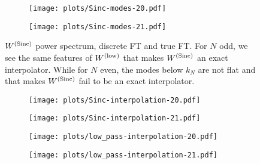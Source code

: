\begin{figure}
   \begin{subfigure}[b]{0.5\textwidth}
         \centering
         \texttt{[image: plots/Sinc-modes-20.pdf]}
     \end{subfigure}
   \begin{subfigure}[b]{0.5\textwidth}
         \centering
         \texttt{[image: plots/Sinc-modes-21.pdf]}
     \end{subfigure}
        \caption{$W^\mathrm{(Sinc)}$ power spectrum, discrete FT and true FT.
        For $N$ odd, we see the same features of $W^\mathrm{(low)}$ that makes
        $W^\mathrm{(Sinc)}$ an exact interpolator.
        While for $N$ even, the modes below $k_N$ are not flat
        and that makes $W^\mathrm{(Sinc)}$ fail to be an exact interpolator.}
        \label{fig:sinc_power}
\end{figure}

\begin{figure}
   \begin{subfigure}[b]{0.5\textwidth}
         \centering
         \texttt{[image: plots/Sinc-interpolation-20.pdf]}
     \end{subfigure}
   \begin{subfigure}[b]{0.5\textwidth}
         \centering
         \texttt{[image: plots/Sinc-interpolation-21.pdf]}
     \end{subfigure}
        \label{fig:sinc_interpolation}
\end{figure}

\begin{figure}
   \begin{subfigure}[b]{0.5\textwidth}
         \centering
         \texttt{[image: plots/low\_pass-interpolation-20.pdf]}
     \end{subfigure}
   \begin{subfigure}[b]{0.5\textwidth}
         \centering
         \texttt{[image: plots/low\_pass-interpolation-21.pdf]}
     \end{subfigure}
        \label{fig:sinc_interpolation}
\end{figure}

